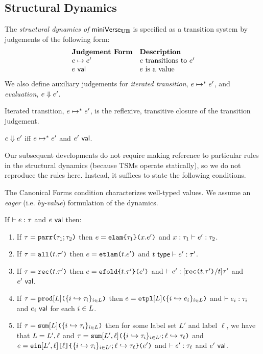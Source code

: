 \subsection{Structural Dynamics}\label{sec:dynamics-U}
The \emph{structural dynamics of }$\mathsf{miniVerse}_\textbf{UE}$ is specified as a transition system by judgements of the following form:
\[\begin{array}{ll}
\textbf{Judgement Form} & \textbf{Description}\\
e \mapsto e' & \text{$e$ transitions to $e'$}\\
e~\mathsf{val} & \text{$e$ is a value}
\end{array}\]
We also define auxiliary judgements for \emph{iterated transition}, $e \mapsto^{*} e'$, and \emph{evaluation}, $e \Downarrow e'$.

\begin{definition}\label{defn:iterated-transition-U} Iterated transition, $e \mapsto^{*} e'$, is the reflexive, transitive closure of the transition judgement.\end{definition}

\begin{definition}[Evaluation]\label{defn:evaluation-U}  $e \Downarrow e'$ iff $e \mapsto^{*} e'$ and $e'~\mathsf{val}$. \end{definition}

Our subsequent developments do not require making reference to particular rules in the structural dynamics (because TSMs operate statically), so we do not reproduce the rules here. Instead, it suffices to state the following conditions.

The Canonical Forms condition characterizes well-typed values. We assume an \emph{eager} (i.e. \emph{by-value}) formulation of the dynamics. 
\begin{condition}\label{condition:canonical-forms-U} If $\vdash e : \tau$ and $e~\mathsf{val}$ then:
\begin{enumerate}
\item If $\tau=\texttt{parr}\texttt{(}\tau_1; \tau_2\texttt{)}$ then $e=\texttt{elam}\texttt{\{}\tau_1\texttt{\}(}x.e'\texttt{)}$ and $x : \tau_1 \vdash e' : \tau_2$.
\item If $\tau=\texttt{all}\texttt{(}t.\tau'\texttt{)}$ then $e=\texttt{etlam}\texttt{(}t.e'\texttt{)}$ and $t~\mathsf{type} \vdash e' : \tau'$.
\item If $\tau=\texttt{rec}\texttt{(}t.\tau'\texttt{)}$ then $e=\texttt{efold}\texttt{\{}t.\tau'\texttt{\}(}e'\texttt{)}$ and $\vdash e' : [\texttt{rec}\texttt{(}t.\tau'\texttt{)}/t]\tau'$ and $e'~\mathsf{val}$. 
\item If $\tau=\texttt{prod}[L]\texttt{(}\{i \hookrightarrow \tau_{i}\}_{i \in L}\texttt{)}$ then $e=\texttt{etpl}[L]\texttt{(}\{i \hookrightarrow e_{i}\}_{i \in L}\texttt{)}$ and $\vdash e_i : \tau_i$ and $e_i~\mathsf{val}$ for each $i \in L$.
\item If $\tau=\texttt{sum}[L]\texttt{(}\{i \hookrightarrow \tau_{i}\}_{i \in L}\texttt{)}$ then for some label set $L'$ and label $\ell$, we have that $L=L', \ell$ and $\tau=\texttt{sum}[L', \ell]\texttt{(}\{i \hookrightarrow \tau_{i}\}_{i \in L'}; \ell \hookrightarrow \tau_\ell\texttt{)}$ and $e=\texttt{ein}[L', \ell]\texttt{[}\ell\texttt{]\{}\{i \hookrightarrow \tau_{i}\}_{i \in L'}; \ell \hookrightarrow \tau_\ell\texttt{\}(}e'\texttt{)}$ and $\vdash e' : \tau_\ell$ and $e'~\mathsf{val}$.
\end{enumerate}\end{condition}

